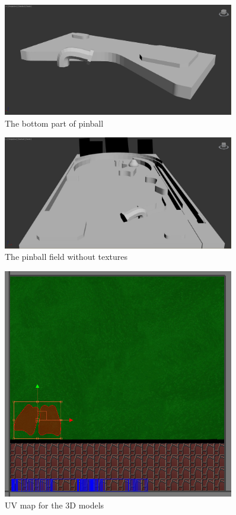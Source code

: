 \documentclass[11.5pt,oneside,a4paper]{scrartcl}
\begin{document}
\begin{figure}
	\centering
	\includegraphics[width=0.90\textwidth]{3dmodelbottom.jpg}
	\caption{The bottom part of pinball}
	\label{fig:pinballbottom}
	\vspace{0.1cm}
\end{figure}

\begin{figure}
	\centering
	\includegraphics[width=0.90\textwidth]{pinballwithouttextures.jpg}
	\caption{The pinball field without textures}
	\label{fig:pinballwithouttextures}
	\vspace{0.1cm}
\end{figure}

\begin{figure}
	\centering
	\includegraphics[width=0.90\textwidth]{texturesfor3dmodel.jpg}
	\caption{UV map for the 3D models}
	\label{fig:texturesfor3dmodel}
	\vspace{0.1cm}
\end{figure}
\end{document}
